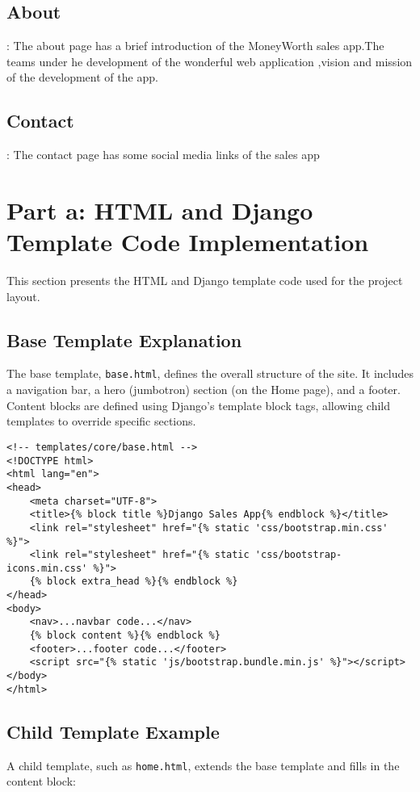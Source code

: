 \documentclass[12pt]{article}
\begin{document}
\subsection{About}:
The about page has a brief introduction of the MoneyWorth sales app.The  teams under he development of the wonderful web application ,vision and mission of the development of the app.
 \subsection{Contact}:
 The contact page has some social media links of the sales app 

\section{Part a: HTML and Django Template Code Implementation}
This section presents the HTML and Django template code used 
for the project layout.

\subsection{Base Template Explanation}
The base template, \texttt{base.html}, defines the overall structure of the site. 
It includes a navigation bar, a hero (jumbotron) section (on the Home page), and a footer. 
Content blocks are defined using Django's template block tags, allowing child templates to 
override specific sections.

\begin{verbatim}
<!-- templates/core/base.html -->
<!DOCTYPE html>
<html lang="en">
<head>
    <meta charset="UTF-8">
    <title>{% block title %}Django Sales App{% endblock %}</title>
    <link rel="stylesheet" href="{% static 'css/bootstrap.min.css' %}">
    <link rel="stylesheet" href="{% static 'css/bootstrap-icons.min.css' %}">
    {% block extra_head %}{% endblock %}
</head>
<body>
    <nav>...navbar code...</nav>
    {% block content %}{% endblock %}
    <footer>...footer code...</footer>
    <script src="{% static 'js/bootstrap.bundle.min.js' %}"></script>
</body>
</html>
\end{verbatim}

\subsection{Child Template Example}
A child template, such as \texttt{home.html}, extends the base template and fills in the 
content block:
\end{document}
